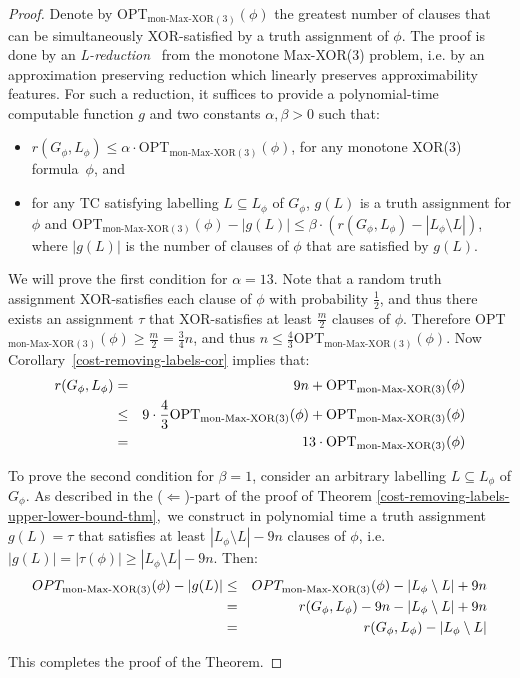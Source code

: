 \documentclass[a4paper,UKenglish]{article}
\begin{document}
\begin{proof}
Denote by OPT$_{\text{mon-Max-XOR}(3)}(\phi )$ the greatest number of
clauses that can be simultaneously XOR-satisfied by a truth assignment of $\phi $. The proof is done by an \emph{L-reduction} \cite{papadimitriou91}\
from the monotone Max-XOR(3) problem, i.e. by an approximation preserving
reduction which linearly preserves approximability features. For such a
reduction, it suffices to provide a polynomial-time computable function $g$
and two constants $\alpha ,\beta >0$ such that:

\begin{itemize}
\item $r(G_{\phi },L_{\phi })\leq \alpha \cdot $OPT$_{\text{mon-Max-XOR}(3)}(\phi )$, for any monotone XOR(3) formula~$\phi$, and

\item for any TC satisfying labelling $L\subseteq L_{\phi }$ of $G_{\phi }$, $g(L)$ is a
truth assignment for $\phi $ and OPT$_{\text{mon-Max-XOR}(3)}(\phi
)-|g(L)|\leq \beta \cdot (r(G_{\phi },L_{\phi })-|L_{\phi }\setminus L|)$,
where $|g(L)|$ is the number of clauses of $\phi $ that are satisfied by $g(L)$.
\end{itemize}

We will prove the first condition for $\alpha =13$. Note that a random truth
assignment XOR-satisfies each clause of $\phi $ with probability $\frac{1}{2}
$, and thus there exists an assignment $\tau $ that XOR-satisfies at least $\frac{m}{2}$ clauses of $\phi $. Therefore OPT$_{\text{mon-Max-XOR}(3)}(\phi
)\geq \frac{m}{2}=\frac{3}{4}n$, and thus $n\leq \frac{4}{3}$OPT$_{\text{mon-Max-XOR}(3)}(\phi )$. Now Corollary~\ref{cost-removing-labels-cor}
implies that:
\begin{eqnarray}
r(G_{\phi },L_{\phi }) &=&9n+\text{OPT}_{\text{mon-Max-XOR}(3)}(\phi ) 
\notag \\
&\leq &9\cdot \frac{4}{3}\text{OPT}_{\text{mon-Max-XOR}(3)}(\phi )+\text{OPT}_{\text{mon-Max-XOR}(3)}(\phi )  \label{apx-hardness-eq-1} \\
&=&13\cdot \text{OPT}_{\text{mon-Max-XOR}(3)}(\phi )  \notag
\end{eqnarray}

To prove the second condition for $\beta =1$, consider an arbitrary labelling 
$L\subseteq L_{\phi }$ of $G_{\phi }$. As described in the ($\Leftarrow $)-part of the proof of Theorem \ref {cost-removing-labels-upper-lower-bound-thm},\ we construct in polynomial
time a truth assignment $g(L)=\tau $ that satisfies at least $|L_{\phi
}\setminus L|-9n$ clauses of $\phi $, i.e. $|g(L)|=|\tau (\phi )|\geq
|L_{\phi }\setminus L|-9n$. Then:
\begin{eqnarray}
OPT_{\text{mon-Max-XOR}(3)}(\phi )-|g(L)| &\leq &OPT_{\text{mon-Max-XOR}(3)}(\phi )-|L_{\phi }\setminus L|+9n  \notag \\
&=&r(G_{\phi },L_{\phi })-9n-|L_{\phi }\setminus L|+9n
\label{apx-hardness-eq-2} \\
&=&r(G_{\phi },L_{\phi })-|L_{\phi }\setminus L|  \notag
\end{eqnarray}

This completes the proof of the Theorem. 
\end{proof}
\end{document}

